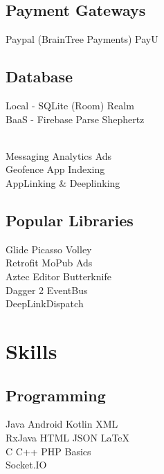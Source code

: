 \documentclass[]{deedy-resume-openfont}
\begin{document}
\begin{minipage}[t]{0.33\textwidth}
\sectionsep

\subsection{Payment Gateways}
Paypal (BrainTree Payments) \textbullet{} PayU \\

\sectionsep

\subsection{Database}
Local - SQLite (Room) \textbullet{} Realm \\
BaaS  - Firebase \textbullet{} Parse \textbullet{} Shephertz

\sectionsep

 \\
Messaging \textbullet{} Analytics \textbullet{} Ads\\
Geofence \textbullet{} App Indexing \\
AppLinking \& Deeplinking

\sectionsep

\subsection{Popular Libraries}
Glide \textbullet{} Picasso \textbullet{} Volley\\
Retrofit \textbullet{} MoPub Ads \\ 
Aztec Editor  \textbullet{} Butterknife\\
Dagger 2 \textbullet{} EventBus\\
DeepLinkDispatch 

\sectionsep





\section{Skills}
\subsection{Programming}
Java \textbullet{}   Android \textbullet{} Kotlin \textbullet{} XML \\
RxJava \textbullet{} HTML \textbullet{} JSON \textbullet{} LaTeX\ \\ 
C \textbullet{} C++ \textbullet{} PHP Basics \\
Socket.IO
\sectionsep

%
%

\end{minipage} 
\end{document}
